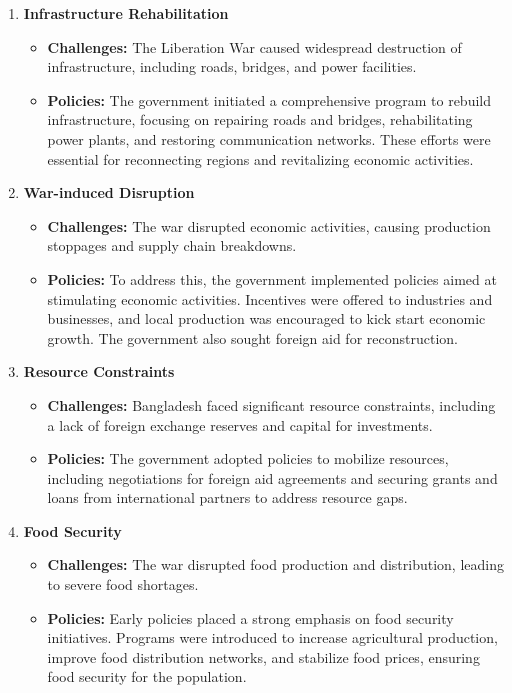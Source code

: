 \begin{enumerate}

	\item\textbf{Infrastructure Rehabilitation}
	\begin{itemize}
		\item\textbf{Challenges:} The Liberation War caused widespread destruction of infrastructure, 
		including roads, bridges, and power facilities.
		\item\textbf{Policies:} The government initiated a comprehensive program to rebuild infrastructure, 
		focusing on repairing roads and bridges, rehabilitating power plants, and restoring communication networks. 
		These efforts were essential for reconnecting regions and revitalizing economic activities.
	\end{itemize}
	
	\item\textbf{War-induced Disruption}
	\begin{itemize}
		\item\textbf{Challenges:} The war disrupted economic activities, 
		causing production stoppages and supply chain breakdowns.
		\item\textbf{Policies:} To address this, the government implemented 
		policies aimed at stimulating economic activities. Incentives were offered to 
		industries and businesses, and local production was encouraged to kick start economic growth. 
		The government also sought foreign aid for reconstruction.
	\end{itemize}
	
	\item\textbf{Resource Constraints}
	\begin{itemize}
		\item\textbf{Challenges:} Bangladesh faced significant resource constraints, 
		including a lack of foreign exchange reserves and capital for investments.
		\item\textbf{Policies:} The government adopted policies to mobilize resources, 
		including negotiations for foreign aid agreements and securing grants and loans 
		from international partners to address resource gaps.
	\end{itemize}
	
	\item\textbf{Food Security}
	\begin{itemize}
		\item\textbf{Challenges:} The war disrupted food production and distribution, leading to severe food shortages.
		\item\textbf{Policies:} Early policies placed a strong emphasis on food security initiatives. 
		Programs were introduced to increase agricultural production, improve food distribution networks, 
		and stabilize food prices, ensuring food security for the population.
	\end{itemize}
	

\end{enumerate}
